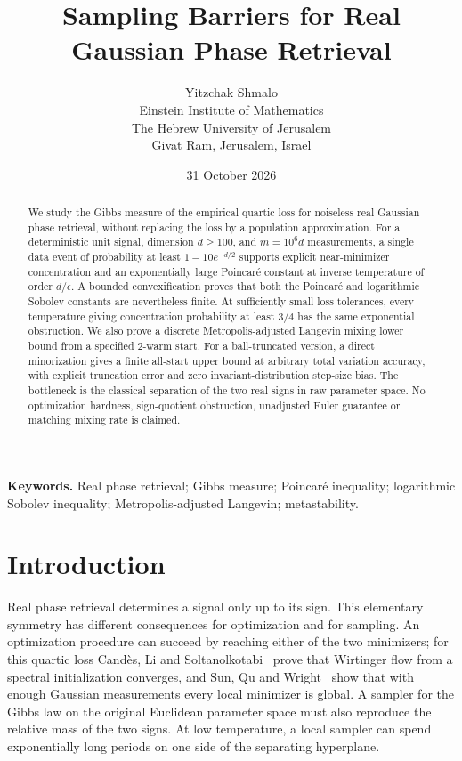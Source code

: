 \documentclass[11pt,letterpaper]{article}
\title{Sampling Barriers for Real Gaussian Phase Retrieval}
\author{Yitzchak Shmalo\\[4pt]
\small Einstein Institute of Mathematics\\
\small The Hebrew University of Jerusalem\\
\small Givat Ram, Jerusalem, Israel}
\date{31 October 2026}
\numberwithin{equation}{section}
\theoremstyle{remark}
\newcommand{\1}{\mathbf 1}
\begin{document}
\maketitle
\begin{abstract}
We study the Gibbs measure of the empirical quartic loss for noiseless real Gaussian phase retrieval, without replacing the loss by a population approximation. For a deterministic unit signal, dimension $d\ge100$, and $m=10^6d$ measurements, a single data event of probability at least $1-10e^{-d/2}$ supports explicit near-minimizer concentration and an exponentially large Poincar\'e constant at inverse temperature of order $d/\epsilon$. A bounded convexification proves that both the Poincar\'e and logarithmic Sobolev constants are nevertheless finite. At sufficiently small loss tolerances, every temperature giving concentration probability at least $3/4$ has the same exponential obstruction. We also prove a discrete Metropolis-adjusted Langevin mixing lower bound from a specified $2$-warm start. For a ball-truncated version, a direct minorization gives a finite all-start upper bound at arbitrary total variation accuracy, with explicit truncation error and zero invariant-distribution step-size bias. The bottleneck is the classical separation of the two real signs in raw parameter space. No optimization hardness, sign-quotient obstruction, unadjusted Euler guarantee or matching mixing rate is claimed.
\end{abstract}
\noindent\textbf{Keywords.} Real phase retrieval; Gibbs measure; Poincar\'e inequality; logarithmic Sobolev inequality; Metropolis-adjusted Langevin; metastability.

\section{Introduction}

Real phase retrieval determines a signal only up to its sign. This elementary symmetry has different consequences for optimization and for sampling. An optimization procedure can succeed by reaching either of the two minimizers; for this quartic loss Cand\`es, Li and Soltanolkotabi~\cite{CLS} prove that Wirtinger flow from a spectral initialization converges, and Sun, Qu and Wright~\cite{SQW} show that with enough Gaussian measurements every local minimizer is global. A sampler for the Gibbs law on the original Euclidean parameter space must also reproduce the relative mass of the two signs. At low temperature, a local sampler can spend exponentially long periods on one side of the separating hyperplane.
\end{document}
